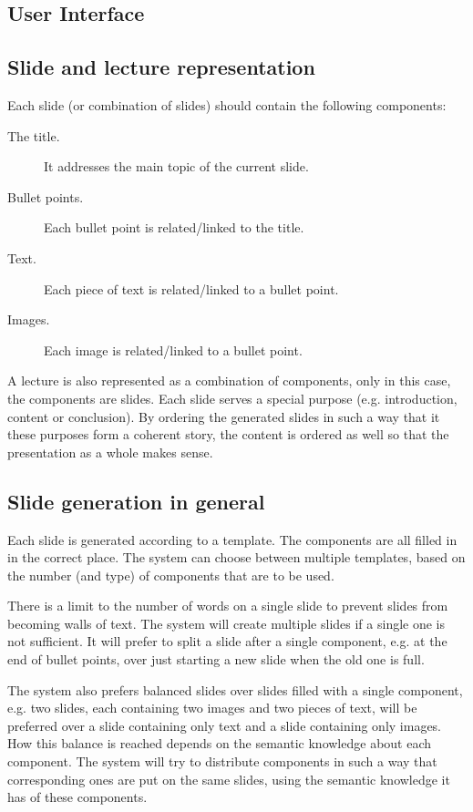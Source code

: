 \documentclass[11pt]{article}
\begin{document}
\subsection{User Interface}

\subsection{Slide and lecture representation}
Each slide (or combination of slides) should contain the following components:
\begin{description}
\item[The title.] It addresses the main topic of the current slide.
\item[Bullet points.] Each bullet point is related/linked to the title. 
\item[Text.] Each piece of text is related/linked to a bullet point.
\item[Images.] Each image is related/linked to a bullet point.
\end{description}
A lecture is also represented as a combination of components, only in this case, the components are slides. Each slide serves a special purpose (e.g. introduction, content or conclusion).  By ordering the generated slides in such a way that it these purposes form a coherent story, the content is ordered as well so that the presentation as a whole makes sense. 

\subsection{Slide generation in general}
Each slide is generated according to a template. The components are all filled in in the correct place. The system can choose between multiple templates, based on the number (and type) of components that are to be used. 

There is a limit to the number of words on a single slide to prevent slides from becoming walls of text. The system will create multiple slides if a single one is not sufficient. It will prefer to split a slide after a single component, e.g. at the end of bullet points, over just starting a new slide when the old one is full. 

The system also prefers balanced slides over slides filled with a single component, e.g. two slides, each containing two images and two pieces of text, will be preferred over a slide containing only text and a slide containing only images. How this balance is reached depends on the semantic knowledge about each component. The system will try to distribute components in such a way that corresponding ones are put on the same slides, using the semantic knowledge it has of these components. 
\end{document}
